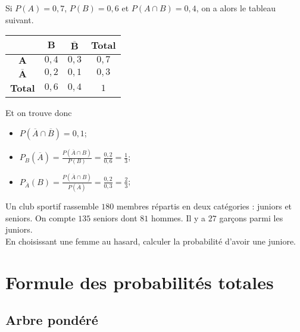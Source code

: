\documentclass[11pt]{article}
\begin{document}
\begin{exemple}
  Si $P(A)=0,7$, $P(B)=0,6$ et $P(A\cap B)=0,4$, on a alors le tableau suivant.
 \begin{center}
\renewcommand{\arraystretch}{1.5}
\begin{tabular}{cccc}
  \toprule
  & $\mathbf{B}$ & $\mathbf{\overline B}$ & \textbf{Total} \\ \midrule
  $\mathbf{A}$ & $0,4$ & $0,3$ & $0,7$ \\
  $\mathbf{\overline A}$ & $0,2$ & $0,1$ & $0,3$ \\
  \textbf{Total} & $0,6$ & $0,4$ & $1$ \\ \bottomrule
\end{tabular}
\end{center}
Et on trouve donc
\begin{itemize}
  \item $P(\overline A\cap\overline B)=0,1$;
  \item $P_B(\overline A)=\frac{P(\overline A\cap
    B)}{P(B)}=\frac{0,2}{0,6}=\frac{1}{3}$;
  \item $P_{\overline A}(B)=\frac{P(\overline A\cap
    B)}{P(\overline A)}=\frac{0,2}{0,3}=\frac{2}{3}$;
\end{itemize}
\end{exemple}

\begin{app}
  Un club sportif rassemble $180$ membres répartis en deux catégories : juniors
  et seniors. On compte $135$ seniors dont $81$ hommes. Il y a $27$ garçons
  parmi les juniors.\\
  En choisissant une femme au hasard, calculer la probabilité d'avoir une
  juniore.
\end{app}

\newpage
\section{Formule des probabilités totales}
\subsection{Arbre pondéré}
\end{document}
